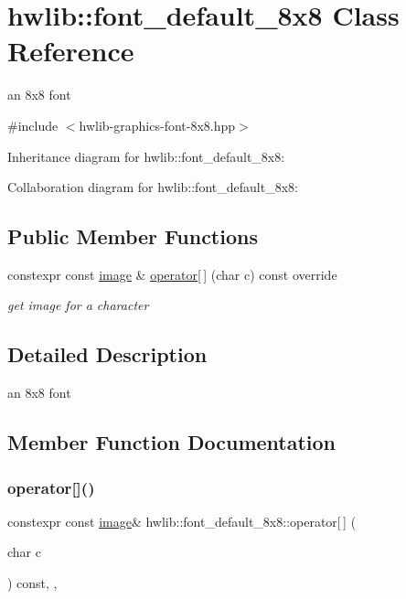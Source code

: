 \hypertarget{classhwlib_1_1font__default__8x8}{}\section{hwlib\+:\+:font\+\_\+default\+\_\+8x8 Class Reference}
\label{classhwlib_1_1font__default__8x8}


an 8x8 font  




{\ttfamily \#include $<$hwlib-\/graphics-\/font-\/8x8.\+hpp$>$}



Inheritance diagram for hwlib\+:\+:font\+\_\+default\+\_\+8x8\+:


Collaboration diagram for hwlib\+:\+:font\+\_\+default\+\_\+8x8\+:
\subsection*{Public Member Functions}
\begin{DoxyCompactItemize}
\item 
constexpr const \hyperlink{classhwlib_1_1image}{image} \& \hyperlink{classhwlib_1_1font__default__8x8_a56cbd6602a4850a957cb26f1f5d6ae85}{operator\mbox{[}$\,$\mbox{]}} (char c) const override
\begin{DoxyCompactList}\small\item\em get image for a character \end{DoxyCompactList}\end{DoxyCompactItemize}


\subsection{Detailed Description}
an 8x8 font 

\subsection{Member Function Documentation}
\mbox{\label{classhwlib_1_1font__default__8x8_a56cbd6602a4850a957cb26f1f5d6ae85}} 
\subsubsection{\texorpdfstring{operator[]()}{operator[]()}}
{\footnotesize\ttfamily constexpr const \hyperlink{classhwlib_1_1image}{image}\& hwlib\+::font\+\_\+default\+\_\+8x8\+::operator\mbox{[}$\,$\mbox{]} (\begin{DoxyParamCaption}\item[{char}]{c }\end{DoxyParamCaption}) const\hspace{0.3cm}{\ttfamily [inline]}, {\ttfamily [override]}, {\ttfamily [virtual]}}



